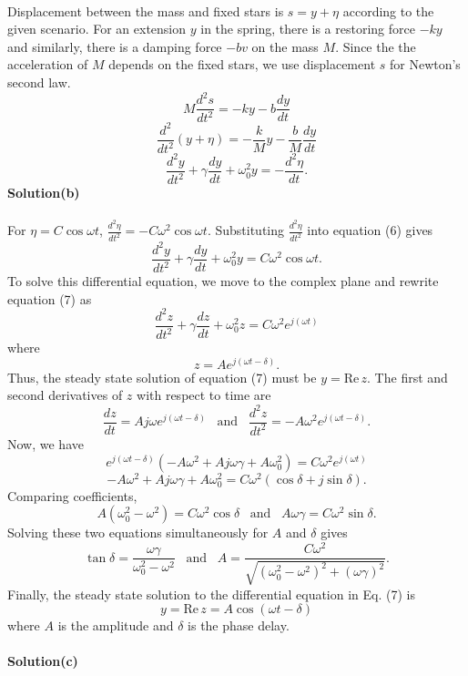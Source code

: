 \documentclass[12pt,a4paper]{article}
\begin{document}
\\Displacement between the mass and fixed stars is $s=y+\eta$ according to the given scenario. For an extension $y$ in the spring, there is a restoring force $-ky$ and similarly, there is a damping force $-bv$ on the mass $M$. Since the the acceleration of $M$ depends on the fixed stars, we use displacement $s$ for Newton's second law.
\[M\frac{d^2s}{dt^2}=-ky-b\frac{dy}{dt}\]
\[\frac{d^2}{dt^2}(y+\eta)=-\frac{k}{M}y-\frac{b}{M}\frac{dy}{dt}\]
\begin{equation}
    \frac{d^2y}{dt^2}+\gamma\frac{dy}{dt}+\omega_0^2y=-\frac{d^2\eta}{dt}.
\end{equation}
\textbf{Solution(b)}
\\
\\For $\eta=C\cos\omega t$, $\frac{d^2\eta}{dt^2}=-C\omega^2\cos\omega t$. Substituting $\frac{d^2\eta}{dt^2}$ into equation (6) gives
\begin{equation}
    \frac{d^2y}{dt^2}+\gamma\frac{dy}{dt}+\omega_0^2y=C\omega^2\cos\omega t.
\end{equation}
To solve this differential equation, we move to the complex plane and rewrite equation (7) as
\[\frac{d^2z}{dt^2}+\gamma\frac{dz}{dt}+\omega_0^2z=C\omega^2e^{j(\omega t)}\]
where
\[z=Ae^{j(\omega t-\delta)}.\]
Thus, the steady state solution of equation (7) must be $y=\text{Re}\,z$. The first and second derivatives of $z$ with respect to time are
\[\frac{dz}{dt}=Aj\omega e^{j(\omega t-\delta)}\,\,\,\,\,\text{and}\,\,\,\,\,\frac{d^2z}{dt^2}=-A\omega^2e^{j(\omega t-\delta)}.\]
Now, we have
\[e^{j(\omega t-\delta)}\left(-A\omega^2+Aj\omega\gamma+A\omega_0^2\right)=C\omega^2e^{j(\omega t)}\]
\[-A\omega^2+Aj\omega\gamma+A\omega_0^2=C\omega^2(\cos\delta+j\sin\delta).\]
Comparing coefficients,
\[A\left(\omega_0^2-\omega^2\right)=C\omega^2\cos\delta\,\,\,\,\,\text{and}\,\,\,\,\,A\omega\gamma=C\omega^2\sin\delta.\]
Solving these two equations simultaneously for $A$ and $\delta$ gives
\[\tan\delta=\frac{\omega\gamma}{\omega_0^2-\omega^2}\,\,\,\,\,\text{and}\,\,\,\,\,A=\frac{C\omega^2}{\sqrt{(\omega_0^2-\omega^2)^2+(\omega\gamma)^2}}.\]
Finally, the steady state solution to the differential equation in Eq. (7) is
\[y=\text{Re}\,z=A\cos(\omega t-\delta)\]
where $A$ is the amplitude and $\delta$ is the phase delay.
\\
\\\textbf{Solution(c)}
\\
\end{document}
